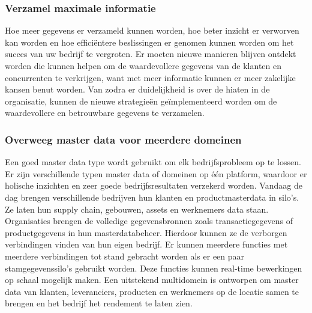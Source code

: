 
\subsubsection{Verzamel maximale informatie}
Hoe meer gegevens er verzameld kunnen worden, hoe beter inzicht er verworven kan worden en hoe efficiëntere beslissingen er genomen kunnen worden om het succes van uw bedrijf te vergroten. Er moeten nieuwe manieren blijven ontdekt worden die kunnen helpen om de waardevollere gegevens van de klanten en concurrenten te verkrijgen, want met meer informatie kunnen er meer zakelijke kansen benut worden. Van zodra er duidelijkheid is over de hiaten in de organisatie, kunnen de nieuwe strategieën geïmplementeerd worden om de waardevollere en betrouwbare gegevens te verzamelen.

\subsubsection{Overweeg master data voor meerdere domeinen}
Een goed master data type wordt gebruikt om elk bedrijfsprobleem op te lossen. Er zijn verschillende typen master data of domeinen op één platform, waardoor er holische inzichten en zeer goede bedrijfsresultaten verzekerd worden. Vandaag de dag brengen verschillende bedrijven hun klanten en productmasterdata in silo’s. Ze laten hun supply chain, gebouwen, assets en werknemers data staan. Organisaties brengen de volledige gegevensbronnen zoals transactiegegevens of productgegevens in hun masterdatabeheer. Hierdoor kunnen ze de verborgen verbindingen vinden van hun eigen bedrijf. Er kunnen meerdere functies met meerdere verbindingen tot stand gebracht worden als er een paar stamgegevenssilo’s gebruikt worden. Deze functies kunnen real-time bewerkingen op schaal mogelijk maken. Een uitstekend multidomein is ontworpen om master data van klanten, leveranciers, producten en werknemers op de locatie samen te brengen en het bedrijf het rendement te laten zien. 

